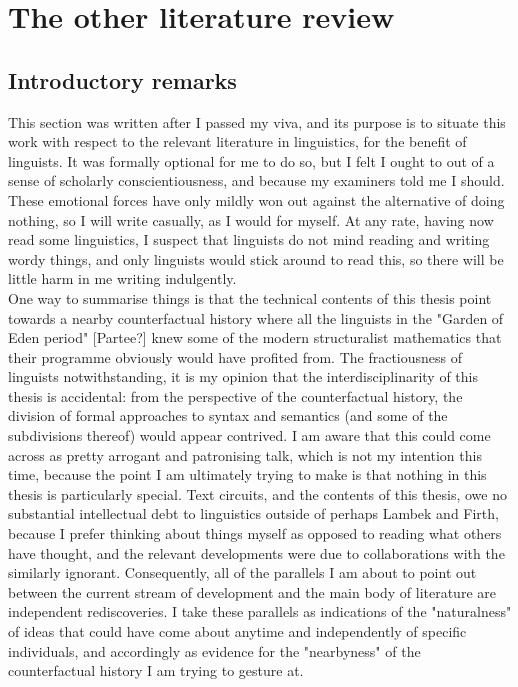 
\section{The other literature review}

\subsection{Introductory remarks}

This section was written after I passed my viva, and its purpose is to situate this work with respect to the relevant literature in linguistics, for the benefit of linguists. It was formally optional for me to do so, but I felt I ought to out of a sense of scholarly conscientiousness, and because my examiners told me I should. These emotional forces have only mildly won out against the alternative of doing nothing, so I will write casually, as I would for myself. At any rate, having now read some linguistics, I suspect that linguists do not mind reading and writing wordy things, and only linguists would stick around to read this, so there will be little harm in me writing indulgently.\\

One way to summarise things is that the technical contents of this thesis point towards a nearby counterfactual history where all the linguists in the "Garden of Eden period" [Partee?] knew some of the modern structuralist mathematics that their programme obviously would have profited from. The fractiousness of linguists notwithstanding, it is my opinion that the interdisciplinarity of this thesis is accidental: from the perspective of the counterfactual history, the division of formal approaches to syntax and semantics (and some of the subdivisions thereof) would appear contrived. I am aware that this could come across as pretty arrogant and patronising talk, which is not my intention this time, because the point I am ultimately trying to make is that nothing in this thesis is particularly special. Text circuits, and the contents of this thesis, owe no substantial intellectual debt to linguistics outside of perhaps Lambek and Firth, because I prefer thinking about things myself as opposed to reading what others have thought, and the relevant developments were due to collaborations with the similarly ignorant. Consequently, all of the parallels I am about to point out between the current stream of development and the main body of literature are independent rediscoveries. I take these parallels as indications of the "naturalness" of ideas that could have come about anytime and independently of specific individuals, and accordingly as evidence for the "nearbyness" of the counterfactual history I am trying to gesture at.

